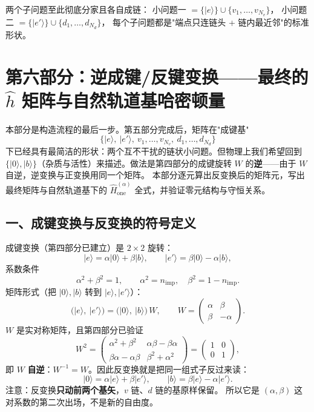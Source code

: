 \documentclass[11pt]{ctexart}
\begin{document}
两个子问题至此彻底分家且各自成链：
小问题一 $=\{|e\rangle\}\cup\{v_1,\dots,v_{N_v}\}$，
小问题二 $=\{|e'\rangle\}\cup\{d_1,\dots,d_{N_d}\}$，
每个子问题都是"端点只连链头 + 链内最近邻"的标准形状。

\medskip
\section*{第六部分：逆成键/反键变换——最终的 $\hat h$ 矩阵与自然轨道基哈密顿量}

\noindent 本部分是构造流程的最后一步。第五部分完成后，矩阵在"成键基"
\[
\big\{|e\rangle,\ |e'\rangle,\ v_1,\dots,v_{N_v},\ d_1,\dots,d_{N_d}\big\}
\]
下已经具有最简洁的形状：两个互不干扰的链状小问题。但物理上我们希望回到
$\{|0\rangle,|b\rangle\}$（杂质与活性）来描述。做法是第四部分的成键旋转
$W$ 的\textbf{逆}——由于 $W$ 自逆，逆变换与正变换用同一个矩阵。
本部分逐元算出反变换后的矩阵元，写出最终矩阵与自然轨道基下的
$\hat H_{\mathrm{one}}^{(\alpha)}$ 全式，并验证零元结构与守恒关系。

\subsection{一、成键变换与反变换的符号定义}

成键变换（第四部分已建立）是 $2\times2$ 旋转：
\[
|e\rangle=\alpha|0\rangle+\beta|b\rangle,
\qquad
|e'\rangle=\beta|0\rangle-\alpha|b\rangle ,
\]
系数条件
\[
\alpha^2+\beta^2=1,
\qquad
\alpha^2=n_{\mathrm{imp}},\quad \beta^2=1-n_{\mathrm{imp}} .
\]
矩阵形式（把 $|0\rangle,|b\rangle$ 转到 $|e\rangle,|e'\rangle$）：
\[
\big(|e\rangle,\ |e'\rangle\big)
=
\big(|0\rangle,\ |b\rangle\big)
\,
W ,
\qquad
W=
\begin{pmatrix}
\alpha & \beta\\
\beta & -\alpha
\end{pmatrix} .
\]
$W$ 是实对称矩阵，且第四部分已验证
\[
W^2=
\begin{pmatrix}
\alpha^2+\beta^2 & \alpha\beta-\beta\alpha\\
\beta\alpha-\alpha\beta & \beta^2+\alpha^2
\end{pmatrix}
=
\begin{pmatrix}1&0\\0&1\end{pmatrix} ,
\]
即 $W$ \textbf{自逆}：$W^{-1}=W$。因此反变换就是把同一组式子反过来读：
\[
|0\rangle=\alpha|e\rangle+\beta|e'\rangle,
\qquad
|b\rangle=\beta|e\rangle-\alpha|e'\rangle .
\]
注意：反变换\textbf{只动前两个基矢}，$v$ 链、$d$ 链的基原样保留。
所以它是 $(\alpha,\beta)$ 这对系数的第二次出场，不是新的自由度。
\end{document}
